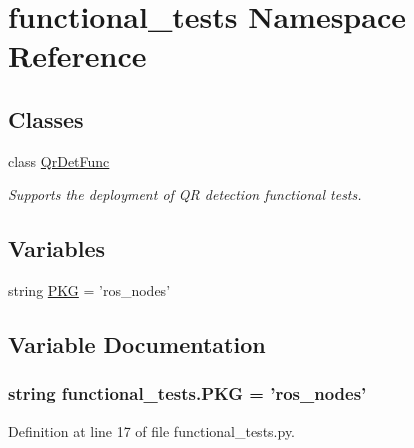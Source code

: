 \hypertarget{namespacefunctional__tests}{\section{functional\-\_\-tests Namespace Reference}
\label{namespacefunctional__tests}
}
\subsection*{Classes}
\begin{DoxyCompactItemize}
\item 
class \hyperlink{classfunctional__tests_1_1QrDetFunc}{Qr\-Det\-Func}
\begin{DoxyCompactList}\small\item\em Supports the deployment of Q\-R detection functional tests. \end{DoxyCompactList}\end{DoxyCompactItemize}
\subsection*{Variables}
\begin{DoxyCompactItemize}
\item 
string \hyperlink{namespacefunctional__tests_a78507f367d6307db1c1633379cbccc35}{P\-K\-G} = 'ros\-\_\-nodes'
\end{DoxyCompactItemize}


\subsection{Variable Documentation}
\hypertarget{namespacefunctional__tests_a78507f367d6307db1c1633379cbccc35}{
\subsubsection[{P\-K\-G}]{\setlength{\rightskip}{0pt plus 5cm}string functional\-\_\-tests.\-P\-K\-G = 'ros\-\_\-nodes'}}\label{namespacefunctional__tests_a78507f367d6307db1c1633379cbccc35}


Definition at line 17 of file functional\-\_\-tests.\-py.


